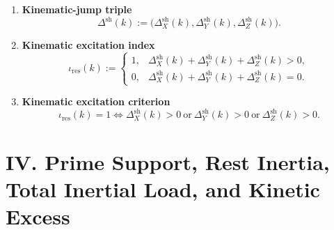 \documentclass[11pt,letterpaper]{article}
\theoremstyle{plain}
\theoremstyle{definition}
\theoremstyle{remark}
\newcommand{\ExcIndex}{\iota}
\begin{document}
\begin{enumerate}[resume]
\item \textbf{Kinematic-jump triple}
\[
\Delta^{\mathrm{sh}}(k):=
\big(\Delta_X^{\mathrm{sh}}(k),\Delta_Y^{\mathrm{sh}}(k),\Delta_Z^{\mathrm{sh}}(k)\big).
\]

\item \textbf{Kinematic excitation index}
\[
\ExcIndex_{\mathrm{res}}(k):=
\begin{cases}
1,& \Delta_X^{\mathrm{sh}}(k)+\Delta_Y^{\mathrm{sh}}(k)+\Delta_Z^{\mathrm{sh}}(k)>0,\\
0,& \Delta_X^{\mathrm{sh}}(k)+\Delta_Y^{\mathrm{sh}}(k)+\Delta_Z^{\mathrm{sh}}(k)=0.
\end{cases}
\]

\item \textbf{Kinematic excitation criterion}
\[
\ExcIndex_{\mathrm{res}}(k)=1
\iff
\Delta_X^{\mathrm{sh}}(k)>0
\ \text{or}\
\Delta_Y^{\mathrm{sh}}(k)>0
\ \text{or}\
\Delta_Z^{\mathrm{sh}}(k)>0.
\]
\end{enumerate}

\section*{IV. Prime Support, Rest Inertia, Total Inertial Load, and Kinetic Excess}
\end{document}
